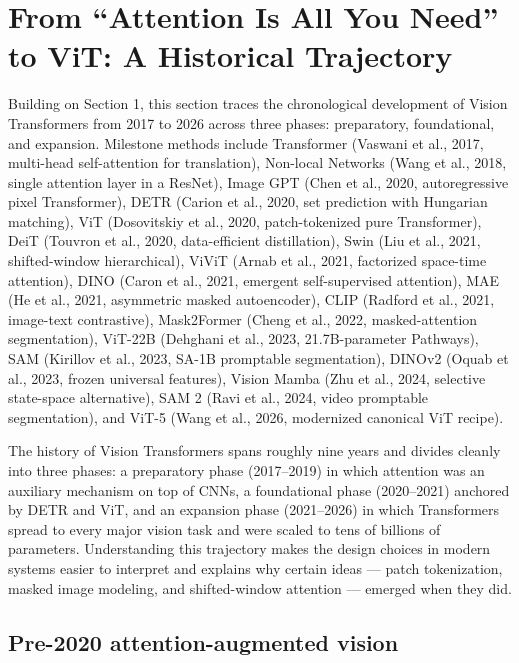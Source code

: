 \documentclass{article}
\begin{document}
\section{From ``Attention Is All You Need'' to ViT: A Historical Trajectory}\label{from-attention-is-all-you-need-to-vit-a-historical-trajectory}

Building on Section 1, this section traces the chronological development of Vision Transformers from 2017 to 2026 across three phases: preparatory, foundational, and expansion. Milestone methods include Transformer (Vaswani et al., 2017, multi-head self-attention for translation), Non-local Networks (Wang et al., 2018, single attention layer in a ResNet), Image GPT (Chen et al., 2020, autoregressive pixel Transformer), DETR (Carion et al., 2020, set prediction with Hungarian matching), ViT (Dosovitskiy et al., 2020, patch-tokenized pure Transformer), DeiT (Touvron et al., 2020, data-efficient distillation), Swin (Liu et al., 2021, shifted-window hierarchical), ViViT (Arnab et al., 2021, factorized space-time attention), DINO (Caron et al., 2021, emergent self-supervised attention), MAE (He et al., 2021, asymmetric masked autoencoder), CLIP (Radford et al., 2021, image-text contrastive), Mask2Former (Cheng et al., 2022, masked-attention segmentation), ViT-22B (Dehghani et al., 2023, 21.7B-parameter Pathways), SAM (Kirillov et al., 2023, SA-1B promptable segmentation), DINOv2 (Oquab et al., 2023, frozen universal features), Vision Mamba (Zhu et al., 2024, selective state-space alternative), SAM 2 (Ravi et al., 2024, video promptable segmentation), and ViT-5 (Wang et al., 2026, modernized canonical ViT recipe).

The history of Vision Transformers spans roughly nine years and divides cleanly into three phases: a preparatory phase (2017--2019) in which attention was an auxiliary mechanism on top of CNNs, a foundational phase (2020--2021) anchored by DETR and ViT, and an expansion phase (2021--2026) in which Transformers spread to every major vision task and were scaled to tens of billions of parameters. Understanding this trajectory makes the design choices in modern systems easier to interpret and explains why certain ideas --- patch tokenization, masked image modeling, and shifted-window attention --- emerged when they did.

\subsection{Pre-2020 attention-augmented vision}\label{pre-2020-attention-augmented-vision}
\end{document}

